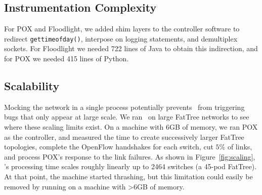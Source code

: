 \subsection{Instrumentation Complexity}

For POX and Floodlight, we added shim layers to the controller software
to redirect {\tt gettimeofday()}, interpose on logging
statements, and demultiplex sockets. For Floodlight we needed 722 lines of Java to obtain this
indirection, and for POX we needed 415 lines of Python.



\subsection{Scalability}
Mocking the network in a single process potentially prevents \projectname~from
triggering bugs that only appear at large scale. We ran
\projectname~on large FatTree networks to see where these scaling limits exist.
On a machine with 6GB of memory, we ran POX as the controller, and measured the
time to create successively larger FatTree
topologies, complete the OpenFlow handshakes for each switch,
cut $5\%$ of links, and process POX's response to the link failures. As shown in
Figure~\ref{fig:scaling}, \projectname's processing time scales roughly
linearly up to 2464 switches (a 45-pod FatTree). At that point, the machine
started thrashing, but this limitation could easily be removed by running on a
machine with >6GB of memory.


